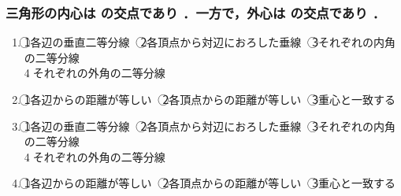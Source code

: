 \documentclass[onecolumn,10pt]{jarticle}
\newcommand{\ctext}[1]{\textcircled{\scriptsize #1}}
\begin{document}
\subsubsection{三角形の内心は  の交点であり  ．一方で，外心は  の交点であり  ．}
\begin{enumerate}[(1)]
    \item \ctext{1}各辺の垂直二等分線　\ctext{2}各頂点から対辺におろした垂線　\ctext{3}それぞれの内角の二等分線\\\ctext{4}それぞれの外角の二等分線
    \item \ctext{1}各辺からの距離が等しい　\ctext{2}各頂点からの距離が等しい　\ctext{3}重心と一致する
    \item \ctext{1}各辺の垂直二等分線　\ctext{2}各頂点から対辺におろした垂線　\ctext{3}それぞれの内角の二等分線\\\ctext{4}それぞれの外角の二等分線
    \item \ctext{1}各辺からの距離が等しい　\ctext{2}各頂点からの距離が等しい　\ctext{3}重心と一致する
\end{enumerate}
\end{document}

